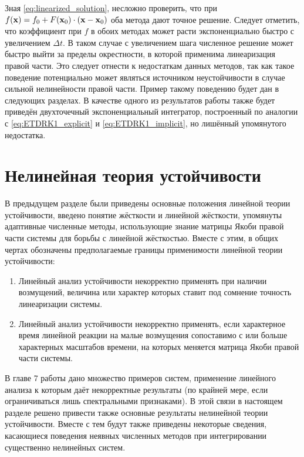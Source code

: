 Зная \eqref{eq:linearized_solution}, несложно проверить, что при $ f(\mathbf{x}) = f_0 + F(\mathbf{x}_0) \cdot (\mathbf{x} - \mathbf{x}_0) $ оба метода дают точное решение.
Следует отметить, что коэффициент при $ f $ в обоих методах может расти экспоненциально быстро с увеличением $ \Delta t $.
В таком случае с увеличением шага численное решение может быстро выйти за пределы окрестности, в которой применима линеаризация правой части.
Это следует отнести к недостаткам данных методов, так как такое поведение потенциально может являться источником неустойчивости в случае сильной нелинейности правой части.
Пример такому поведению будет дан в следующих разделах.
В качестве одного из результатов работы также будет приведён двухточечный экспоненциальный интегратор,
построенный по аналогии с \eqref{eq:ETDRK1_explicit} и \eqref{eq:ETDRK1_implicit}, но лишённый упомянутого недостатка.



\section{Нелинейная теория устойчивости}
\label{sec:nonlinear_stability}

В предыдущем разделе были приведены основные положения линейной теории устойчивости,
введено понятие жёсткости и линейной жёсткости,
упомянуты адаптивные численные методы, использующие знание матрицы Якоби правой части системы для борьбы с линейной жёсткостью.
Вместе с этим, в общих чертах обозначены предполагаемые границы применимости линейной теории устойчивости:
\begin{enumerate}
    \item
        Линейный анализ устойчивости некорректно применять при наличии возмущений,
        величина или характер которых ставит под сомнение точность линеаризации системы.
    \item
        Линейный анализ устойчивости некорректно применять,
        если характерное время линейной реакции на малые возмущения сопоставимо с или больше характерных масштабов времени,
        на которых меняется матрица Якоби правой части системы.
\end{enumerate}

В главе 7 работы \cite{lambert1991methods} дано множество примеров систем,
применение линейного анализа к которым даёт некорректные результаты
(по крайней мере, если ограничиваться лишь спектральными признаками).
В этой связи в настоящем разделе решено привести также основные результаты нелинейной теории устойчивости.
Вместе с тем будут также приведены некоторые сведения,
касающиеся поведения неявных численных методов при интегрировании существенно нелинейных систем.


